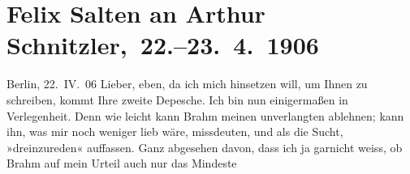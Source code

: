 

         
         \renewcommand{\erwaehntePersonen}{Personen: Otto Brahm, Alphonse Daudet, Julius Elias, Paul Goldmann, Adalbert von Goldschmidt, Siegfried Jacobsohn, Emanuel Reicher, Rudolf Rittner, Felix Salten, Ottilie Salten, Olga Schnitzler}
         \renewcommand{\erwaehnteOrte}{Orte: Berlin, Lessing-Theater, Wien}
         \renewcommand{\erwaehnteWerke}{Werke: Der Ruf des Lebens. Schauspiel in drei Akten, Der einsame Weg, Der einsame Weg. Schauspiel in fünf Akten, Die Schaubühne, Elga}
               \section[ Felix Salten an Arthur Schnitzler, 22.–23. 4. 1906]{ Felix Salten an Arthur Schnitzler, 22.–23. 4. 1906}\nopagebreak{}\rehead{ }\begin{ledgroupsized}[t]{13cm}\normalsize\beginnumbering{} \toendnotes[C]{\smallbreak\pagebreak[2]} 
\toendnotes[C]{\smallbreak}\pstart
           \raggedleft{}{\pb}Berlin, 22. IV. 06\pend
           \pstart
           Lieber, eben, da ich mich hinsetzen will, um Ihnen zu schreiben,
               kommt Ihre zweite Depesche. Ich bin nun einigermaßen in Verlegenheit. Denn wie leicht
               kann Brahm meinen unverlangten \label{K_L03421-1v}\label{K_L03421-1h} ablehnen; kann ihn, was mir noch weniger lieb wäre, missdeuten, und als die
               Sucht, »dreinzureden« auffassen. Ganz abgesehen davon, dass ich ja garnicht weiss, ob
                  Brahm auf mein Urteil auch nur das Mindeste

\end{ledgroupsized}
